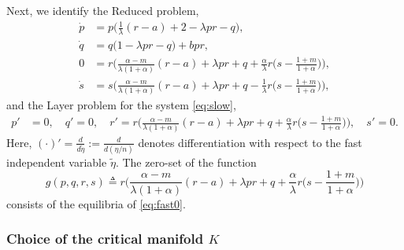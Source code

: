 \documentclass[11pt]{article}
\theoremstyle{remark}
\begin{document}
Next, we identify the Reduced problem,
\begin{equation}\label{eq:slow0} \tag{R}
 \begin{aligned}
 \dot{p} &=p\Big(\frac{1}{\lambda}({r}-a) + 2- \lambda p {r} -q\Big),\\%
 \dot{q} &=q\Big(1 -\lambda p {r} -q\Big) + b p {r},\\%
 0&=r\Big(\frac{\alpha-m}{\lambda(1+\alpha)}(r-a) + \lambda pr + q +\frac{\alpha}{\lambda}r\big(s- \frac{1+m}{1+\alpha}\big)\Big),\\
 \dot{s} &=s\Big(\frac{\alpha-m}{\lambda(1+\alpha)}({r}-a) + \lambda p{r} + q - \frac{1}{\lambda}{r}\big(s- \frac{1+m}{1+\alpha}\big)\Big),%
 \end{aligned}
\end{equation}
and the Layer problem for the system \eqref{eq:slow},
\begin{equation} \label{eq:fast0}
 \begin{aligned}
 {p}' &=0, \quad {q}' =0, \quad {r}' =r\Big(\frac{\alpha-m}{\lambda(1+\alpha)}(r-a) + \lambda pr + q +\frac{\alpha}{\lambda}r\big(s- \frac{1+m}{1+\alpha}\big)\Big),  \quad{s}' =0 .
 \end{aligned}
\end{equation}
Here, $(\cdot)'= \frac{d}{d\tilde{\eta}} := \frac{d}{d(\eta/n)}$ denotes differentiation with respect to the fast independent variable $\tilde{\eta}$. The zero-set  of
the function
\begin{equation}
g(p,q,r,s) \triangleq r\Big(\frac{\alpha-m}{\lambda(1+\alpha)}(r-a) + \lambda pr + q +\frac{\alpha}{\lambda}r\big(s- \frac{1+m}{1+\alpha}\big)\Big)\label{eq:zeroset}
\end{equation}
consists of the equilibria of \eqref{eq:fast0}.

\subsubsection{Choice of the critical manifold $K$} \label{sec:choice}
\end{document}
